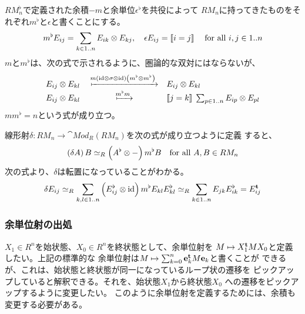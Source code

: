 {	$RM_n^\flat$で定義された余積$-m$と余単位$\epsilon^\flat$を共役によって
	$RM_n$に持ってきたものをそれぞれ$m^\flat$と$\epsilon$と書くことにする。
	\begin{equation*}\begin{split}
		m^\flat E_{ij} = \sum_{k\in1..n} E_{ik}\otimes E_{kj},\quad
		\epsilon E_{ij} = [\![i=j]\!]\; \quad\text{for all } i,j\in1..n
	\end{split}\end{equation*}
	$m$と$m^\flat$は、次の式で示されるように、圏論的な双対にはならないが、
	\begin{equation*}\begin{array}{rcl}
		E_{ij}\otimes E_{kl} 
		&\xmapsto{m\lr{\id\otimes\sigma\otimes\id}\lr{m^\flat\otimes m^\flat}}&
			E_{ij}\otimes E_{kl} \\
		E_{ij}\otimes E_{kl} &\xmapsto{m^\flat m}&
			\jump{j=k} \sum_{p\in1..n} E_{ip}\otimes E_{pl} \\
	\end{array}\end{equation*}
	$mm^\flat=n$という式が成り立つ。

	線形射$\delta:RM_n\to\cat{Mod}_R(RM_n)$を次の式が成り立つように定義
	すると、
	\begin{equation*}\begin{split}
		\left({\delta A}\right)B \simeq_R \left({A^\flat\otimes-}\right) m^\flat B
		\quad\text{for all } A,B\in RM_n
	\end{split}\end{equation*}
	次の式より、$\delta$は転置になっていることがわかる。
	\begin{equation*}\begin{split}
		\delta E_{ij}
		\simeq_R \sum_{k,l\in1..n} \left({E_{ij}^\flat\otimes{\ensuremath{\operatorname{id}}}}\right) 
		m^\flat E_{kl}E_{kl}^\flat
		\simeq_R \sum_{k\in1..n} E_{jk}E_{ik}^\flat
		= E_{ij}^{\mathbf{t}}
	\end{split}\end{equation*}

\subsubsection{余単位射の出処}\label{s3:余単位射の出処} %
	$X_1\in R^n$を始状態、$X_0\in R^n$を終状態として、余単位射を
	$M\mapsto X_1^{\mathbf{t}} MX_0$と定義したい。上記の標準的な
	余単位射は$M\mapsto\sum_{k=0}^n{\mathbf{e}}_k^{\mathbf{t}} M{\mathbf{e}}_k$と書くことが
	できるが、これは、始状態と終状態が同一になっているループ状の遷移を
	ピックアップしていると解釈できる。それを、始状態$X_1$から終状態$X_0$
	への遷移をピックアップするように変更したい。
	このように余単位射を定義するためには、余積も変更する必要がある。

}
